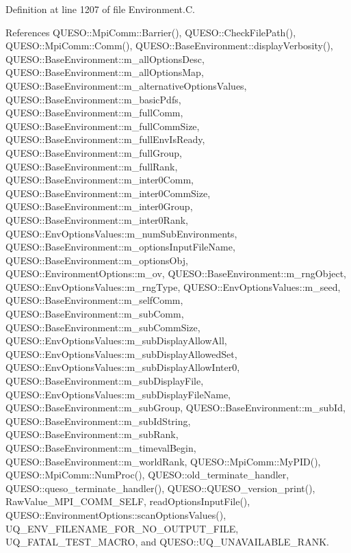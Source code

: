 Definition at line 1207 of file Environment.\-C.



References Q\-U\-E\-S\-O\-::\-Mpi\-Comm\-::\-Barrier(), Q\-U\-E\-S\-O\-::\-Check\-File\-Path(), Q\-U\-E\-S\-O\-::\-Mpi\-Comm\-::\-Comm(), Q\-U\-E\-S\-O\-::\-Base\-Environment\-::display\-Verbosity(), Q\-U\-E\-S\-O\-::\-Base\-Environment\-::m\-\_\-all\-Options\-Desc, Q\-U\-E\-S\-O\-::\-Base\-Environment\-::m\-\_\-all\-Options\-Map, Q\-U\-E\-S\-O\-::\-Base\-Environment\-::m\-\_\-alternative\-Options\-Values, Q\-U\-E\-S\-O\-::\-Base\-Environment\-::m\-\_\-basic\-Pdfs, Q\-U\-E\-S\-O\-::\-Base\-Environment\-::m\-\_\-full\-Comm, Q\-U\-E\-S\-O\-::\-Base\-Environment\-::m\-\_\-full\-Comm\-Size, Q\-U\-E\-S\-O\-::\-Base\-Environment\-::m\-\_\-full\-Env\-Is\-Ready, Q\-U\-E\-S\-O\-::\-Base\-Environment\-::m\-\_\-full\-Group, Q\-U\-E\-S\-O\-::\-Base\-Environment\-::m\-\_\-full\-Rank, Q\-U\-E\-S\-O\-::\-Base\-Environment\-::m\-\_\-inter0\-Comm, Q\-U\-E\-S\-O\-::\-Base\-Environment\-::m\-\_\-inter0\-Comm\-Size, Q\-U\-E\-S\-O\-::\-Base\-Environment\-::m\-\_\-inter0\-Group, Q\-U\-E\-S\-O\-::\-Base\-Environment\-::m\-\_\-inter0\-Rank, Q\-U\-E\-S\-O\-::\-Env\-Options\-Values\-::m\-\_\-num\-Sub\-Environments, Q\-U\-E\-S\-O\-::\-Base\-Environment\-::m\-\_\-options\-Input\-File\-Name, Q\-U\-E\-S\-O\-::\-Base\-Environment\-::m\-\_\-options\-Obj, Q\-U\-E\-S\-O\-::\-Environment\-Options\-::m\-\_\-ov, Q\-U\-E\-S\-O\-::\-Base\-Environment\-::m\-\_\-rng\-Object, Q\-U\-E\-S\-O\-::\-Env\-Options\-Values\-::m\-\_\-rng\-Type, Q\-U\-E\-S\-O\-::\-Env\-Options\-Values\-::m\-\_\-seed, Q\-U\-E\-S\-O\-::\-Base\-Environment\-::m\-\_\-self\-Comm, Q\-U\-E\-S\-O\-::\-Base\-Environment\-::m\-\_\-sub\-Comm, Q\-U\-E\-S\-O\-::\-Base\-Environment\-::m\-\_\-sub\-Comm\-Size, Q\-U\-E\-S\-O\-::\-Env\-Options\-Values\-::m\-\_\-sub\-Display\-Allow\-All, Q\-U\-E\-S\-O\-::\-Env\-Options\-Values\-::m\-\_\-sub\-Display\-Allowed\-Set, Q\-U\-E\-S\-O\-::\-Env\-Options\-Values\-::m\-\_\-sub\-Display\-Allow\-Inter0, Q\-U\-E\-S\-O\-::\-Base\-Environment\-::m\-\_\-sub\-Display\-File, Q\-U\-E\-S\-O\-::\-Env\-Options\-Values\-::m\-\_\-sub\-Display\-File\-Name, Q\-U\-E\-S\-O\-::\-Base\-Environment\-::m\-\_\-sub\-Group, Q\-U\-E\-S\-O\-::\-Base\-Environment\-::m\-\_\-sub\-Id, Q\-U\-E\-S\-O\-::\-Base\-Environment\-::m\-\_\-sub\-Id\-String, Q\-U\-E\-S\-O\-::\-Base\-Environment\-::m\-\_\-sub\-Rank, Q\-U\-E\-S\-O\-::\-Base\-Environment\-::m\-\_\-timeval\-Begin, Q\-U\-E\-S\-O\-::\-Base\-Environment\-::m\-\_\-world\-Rank, Q\-U\-E\-S\-O\-::\-Mpi\-Comm\-::\-My\-P\-I\-D(), Q\-U\-E\-S\-O\-::\-Mpi\-Comm\-::\-Num\-Proc(), Q\-U\-E\-S\-O\-::old\-\_\-terminate\-\_\-handler, Q\-U\-E\-S\-O\-::queso\-\_\-terminate\-\_\-handler(), Q\-U\-E\-S\-O\-::\-Q\-U\-E\-S\-O\-\_\-version\-\_\-print(), Raw\-Value\-\_\-\-M\-P\-I\-\_\-\-C\-O\-M\-M\-\_\-\-S\-E\-L\-F, read\-Options\-Input\-File(), Q\-U\-E\-S\-O\-::\-Environment\-Options\-::scan\-Options\-Values(), U\-Q\-\_\-\-E\-N\-V\-\_\-\-F\-I\-L\-E\-N\-A\-M\-E\-\_\-\-F\-O\-R\-\_\-\-N\-O\-\_\-\-O\-U\-T\-P\-U\-T\-\_\-\-F\-I\-L\-E, U\-Q\-\_\-\-F\-A\-T\-A\-L\-\_\-\-T\-E\-S\-T\-\_\-\-M\-A\-C\-R\-O, and Q\-U\-E\-S\-O\-::\-U\-Q\-\_\-\-U\-N\-A\-V\-A\-I\-L\-A\-B\-L\-E\-\_\-\-R\-A\-N\-K.


